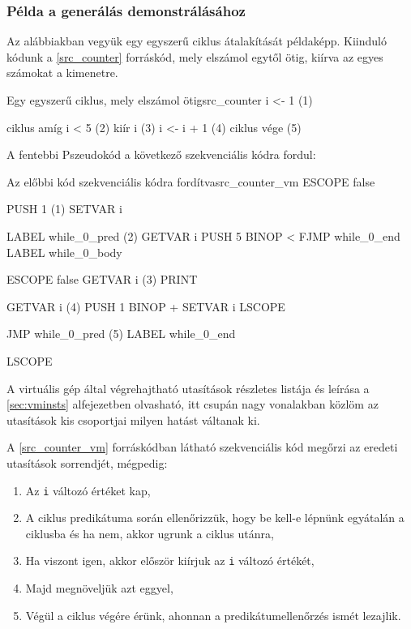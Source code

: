 \subsubsection{Példa a generálás demonstrálásához}

Az alábbiakban vegyük egy egyszerű ciklus átalakítását példaképp. Kiinduló kódunk a \ref{src_counter} forráskód, mely elszámol egytől ötig, kiírva az egyes számokat a kimenetre.

\begin{code}{Egy egyszerű ciklus, mely elszámol ötig}{src_counter}
i <- 1 (1)

ciklus amíg i < 5 (2)
  kiír i (3)
  i <- i + 1 (4)
ciklus vége (5)
\end{code}

A fentebbi Pszeudokód a következő szekvenciális kódra fordul:

\begin{code}{Az előbbi kód szekvenciális kódra fordítva}{src_counter_vm}
ESCOPE false

 PUSH   1 (1)
 SETVAR i

 LABEL  while_0_pred (2)
 GETVAR i
 PUSH   5
 BINOP  <
 FJMP   while_0_end
 LABEL  while_0_body

 ESCOPE false
  GETVAR i (3)
  PRINT

  GETVAR i (4)
  PUSH   1
  BINOP  +
  SETVAR i
 LSCOPE

 JMP   while_0_pred (5)
 LABEL while_0_end

LSCOPE
\end{code}

A virtuális gép által végrehajtható utasítások részletes listája és leírása a \ref{sec:vminsts} alfejezetben olvasható, itt csupán nagy vonalakban közlöm az utasítások kis csoportjai milyen hatást váltanak ki.

A \ref{src_counter_vm} forráskódban látható szekvenciális kód megőrzi az eredeti utasítások sorrendjét, mégpedig:

\begin{enumerate}
    \item Az \texttt{i} változó értéket kap,
    \item A ciklus predikátuma során ellenőrizzük, hogy be kell-e lépnünk egyátalán a ciklusba és ha nem, akkor ugrunk a ciklus utánra,
    \item Ha viszont igen, akkor először kiírjuk az \texttt{i} változó értékét,
    \item Majd megnöveljük azt eggyel,
    \item Végül a ciklus végére érünk, ahonnan a predikátumellenőrzés ismét lezajlik.
\end{enumerate}

